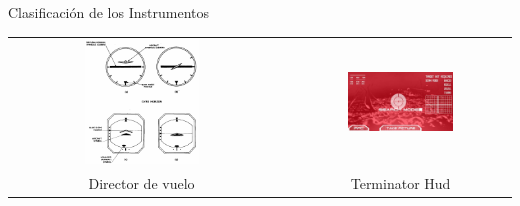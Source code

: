 \documentclass[10pt]{beamer}
\begin{document}
\begin{frame}{Clasificaci\'on de los Instrumentos}

  \begin{tabular}{ccc}
    \includegraphics[width=0.45\textwidth]{imagenes/1.2.clasificacion.instrumentos/director.png} & \hspace{3mm}
&     \includegraphics[width=0.5\textwidth]{imagenes/1.2.clasificacion.instrumentos/terminator_hud.png}
\\
\parbox{0.45\textwidth}{Director de vuelo}
&
& Terminator Hud
\\
  \end{tabular}

\end{frame}
\end{document}
